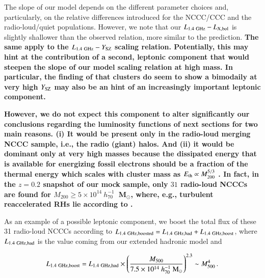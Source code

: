 \documentclass[useAMS,usenatbib]{mn2e}
\begin{document}
The slope of our model depends on the different parameter choices and,
particularly, on the relative differences introduced for the NCCC/CCC and 
the radio-loud/quiet populations. However, we note that our
$L_{1.4~{\mathrm{GHz}}}-L_{{\mathrm{X,bol}}}$ is slightly shallower than the 
observed relation, more similar to the \cite{2009JCAP...09..024K} prediction.
{\bf The same apply to the $L_{1.4~{\mathrm{GHz}}}-Y_{{\mathrm{SZ}}}$ scaling relation. 
Potentially, this may hint at the contribution of a second, leptonic component
that would steepen the slope of our model scaling relation at high mass.
In particular, the finding of \cite{2013arXiv1306.4379C} that clusters do 
seem to show a bimodaily at very high $Y_{{\mathrm{SZ}}}$ may also be an hint 
of an increasingly important leptonic component.} 
{\bf However, we do not expect this component to alter significantly our conclusions
regarding the luminosity functions of next sections for two main reasons. (i) It would be present 
only in the radio-loud merging NCCC sample, i.e., the radio (giant) halos. And (ii) it would be dominant only 
at very high masses because the dissipated energy that is available for energizing fossil electrons should 
be a fraction of the thermal energy which scales with cluster mass as $E_{\mathrm{th}}\propto M_{200}^{5/3}$ \citep[][for 
magneto-turbulent re-acceleration models]{2005MNRAS.357.1313C}. In fact, in the $z = 0.2$ snapshot 
of our mock sample, only $31$ radio-loud \mbox{NCCCs} are found for $M_{200}\geq5\times10^{14}~h_{70}^{-1}$~M$_{\odot}$, 
where, e.g., turbulent reaccelerated RHs lie according to \cite{2010A&A...509A..68C}. 

As an example of a possible leptonic component, we boost the total flux of these 31 radio-loud NCCCs 
according to $L_{1.4~{\mathrm{GHz, boosted}}} = L_{1.4~{\mathrm{GHz, had}}} + L_{1.4~{\mathrm{GHz, boost}}}$,
where $L_{1.4~{\mathrm{GHz, had}}}$ is the value coming from our extended hadronic model
and

\begin{equation}
L_{1.4~{\mathrm{GHz, boost}}} = L_{1.4~{\mathrm{GHz, had}}} \times \left( \frac{M_{500}}{7.5\times10^{14}~h_{70}^{-1}~{\mathrm{M}}_{\odot}} \right)^{2.3} \sim M_{500}^4 \, .
\label{eg:leptonic_boost}
\end{equation}

}
\end{document}
